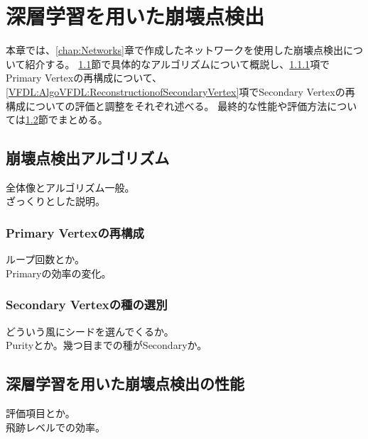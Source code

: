 
\chapter{深層学習を用いた崩壊点検出} \label{chap:VertexFinderwithDL}

本章では、\ref{chap:Networks}章で作成したネットワークを使用した崩壊点検出について紹介する。
\ref{VFDL:AlgorithmforVFDL}節で具体的なアルゴリズムについて概説し、\ref{VFDL:AlgoVFDL:ReconstructionofPrimaryVertex}項でPrimary Vertexの再構成について、\ref{VFDL:AlgoVFDL:ReconstructionofSecondaryVertex}項でSecondary Vertexの再構成についての評価と調整をそれぞれ述べる。
最終的な性能や評価方法については\ref{VFDL:PerformanceofVFDL}節でまとめる。


\section{崩壊点検出アルゴリズム} \label{VFDL:AlgorithmforVFDL}

全体像とアルゴリズム一般。\\
ざっくりとした説明。\\

\subsection{Primary Vertexの再構成} \label{VFDL:AlgoVFDL:ReconstructionofPrimaryVertex}

ループ回数とか。\\
Primaryの効率の変化。\\

\subsection{Secondary Vertexの種の選別} \label{VFDL:AlgoVFDL:SelectionofSecondaryVertexSeed}

どういう風にシードを選んでくるか。\\
Purityとか。幾つ目までの種がSecondaryか。\\

\section{深層学習を用いた崩壊点検出の性能} \label{VFDL:PerformanceofVFDL}

評価項目とか。\\
飛跡レベルでの効率。\\

